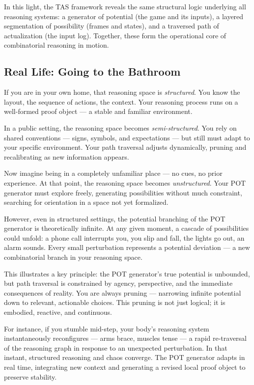 \documentclass[11pt]{article}
\begin{document}
In this light, the TAS framework reveals the same structural logic underlying all reasoning systems: a generator of potential (the game and its inputs), a layered segmentation of possibility (frames and states), and a traversed path of actualization (the input log). Together, these form the operational core of combinatorial reasoning in motion.

\subsection{Real Life: Going to the Bathroom}

If you are in your own home, that reasoning space is \textit{structured}. You know the layout, the sequence of actions, the context. Your reasoning process runs on a well-formed proof object --- a stable and familiar environment.

In a public setting, the reasoning space becomes \textit{semi-structured}. You rely on shared conventions --- signs, symbols, and expectations --- but still must adapt to your specific environment. Your path traversal adjusts dynamically, pruning and recalibrating as new information appears.

Now imagine being in a completely unfamiliar place --- no cues, no prior experience. At that point, the reasoning space becomes \textit{unstructured}. Your POT generator must explore freely, generating possibilities without much constraint, searching for orientation in a space not yet formalized.

However, even in structured settings, the potential branching of the POT generator is theoretically infinite. At any given moment, a cascade of possibilities could unfold: a phone call interrupts you, you slip and fall, the lights go out, an alarm sounds. Every small perturbation represents a potential deviation --- a new combinatorial branch in your reasoning space.

This illustrates a key principle: the POT generator’s true potential is unbounded, but path traversal is constrained by agency, perspective, and the immediate consequences of reality. You are always pruning --- narrowing infinite potential down to relevant, actionable choices. This pruning is not just logical; it is embodied, reactive, and continuous.

For instance, if you stumble mid-step, your body’s reasoning system instantaneously reconfigures --- arms brace, muscles tense --- a rapid re-traversal of the reasoning graph in response to an unexpected perturbation. In that instant, structured reasoning and chaos converge. The POT generator adapts in real time, integrating new context and generating a revised local proof object to preserve stability.
\end{document}
